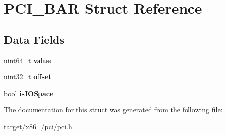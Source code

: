 \hypertarget{structPCI__BAR}{}\section{P\+C\+I\+\_\+\+B\+AR Struct Reference}
\label{structPCI__BAR}
\subsection*{Data Fields}
\begin{DoxyCompactItemize}
\item 
uint64\+\_\+t {\bfseries value}\hypertarget{structPCI__BAR_af3d652869f3a4c72bf912ad7773d258c}{}\label{structPCI__BAR_af3d652869f3a4c72bf912ad7773d258c}

\item 
uint32\+\_\+t {\bfseries offset}\hypertarget{structPCI__BAR_a118f1f2a553b40ad5598d8afdebd6311}{}\label{structPCI__BAR_a118f1f2a553b40ad5598d8afdebd6311}

\item 
bool {\bfseries is\+I\+O\+Space}\hypertarget{structPCI__BAR_ad394c20456f36c4fca7395f23d5af306}{}\label{structPCI__BAR_ad394c20456f36c4fca7395f23d5af306}

\end{DoxyCompactItemize}


The documentation for this struct was generated from the following file\+:\begin{DoxyCompactItemize}
\item 
target/x86\+\_/pci/pci.\+h\end{DoxyCompactItemize}
